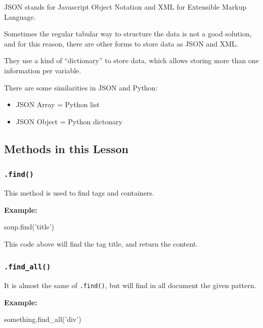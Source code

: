 \documentclass[]{book}
\newenvironment{Shaded}{\begin{snugshade}}{\end{snugshade}}
\newcommand{\StringTok}[1]{\textcolor[rgb]{0.31,0.60,0.02}{#1}}
\newcommand{\NormalTok}[1]{#1}
\providecommand{\tightlist}{%
  \setlength{\itemsep}{0pt}\setlength{\parskip}{0pt}}
\begin{document}
JSON stands for Javascript Object Notation and XML for Extensible Markup
Language.

Sometimes the regular tabular way to structure the data is not a good
solution, and for this reason, there are other forms to store data as
JSON and XML.

They use a kind of ``dictionary'' to store data, which allows storing
more than one information per variable.

There are some similarities in JSON and Python:

\begin{itemize}
\tightlist
\item
  JSON Array = Python list
\item
  JSON Object = Python dictonary
\end{itemize}

\subsection{Methods in this Lesson}\label{methods-in-this-lesson}

\subsubsection{\texorpdfstring{\texttt{.find()}}{.find()}}\label{find}

This method is used to find tags and containers.

\textbf{Example:}

\begin{Shaded}
\begin{Highlighting}[]
\NormalTok{soup.find(}\StringTok{'title'}\NormalTok{)}
\end{Highlighting}
\end{Shaded}

This code above will find the tag title, and return the content.

\subsubsection{\texorpdfstring{\texttt{.find\_all()}}{.find\_all()}}\label{find_all}

It is almost the same of \texttt{.find()}, but will find in all document
the given pattern.

\textbf{Example:}

\begin{Shaded}
\begin{Highlighting}[]
\NormalTok{something.find_all(}\StringTok{'div'}\NormalTok{)}
\end{Highlighting}
\end{Shaded}
\end{document}
